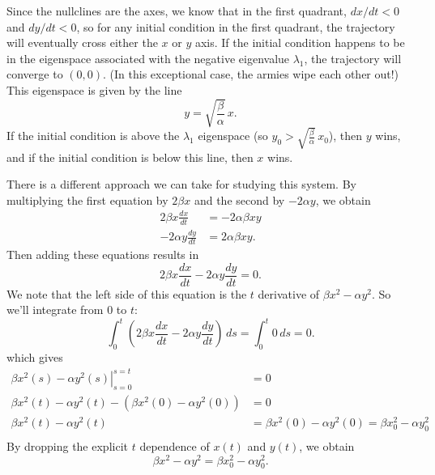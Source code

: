 \documentclass{book}
\begin{document}
Since the nullclines are the axes, we know that in the first
quadrant, $dx/dt < 0$ and $dy/dt < 0$, so for any initial
condition in the first quadrant, the trajectory will eventually
cross either the $x$ or $y$ axis. If the initial condition
happens to be in the eigenspace associated with the negative
eigenvalue $\lambda_1$, the trajectory will converge to
$(0,0)$. (In this exceptional case, the armies wipe each
other out!)
This eigenspace is given by the line
\begin{equation}
  y = \sqrt{\frac{\beta}{\alpha}}\, x.
\end{equation}
If the initial condition is above the $\lambda_1$ eigenspace
(so $y_0 > \sqrt{\frac{\beta}{\alpha}}\, x_0$), then
$y$ wins, and if the initial condition is below this line,
then $x$ wins.

There is a different approach we can take for studying
this system.
By multiplying the first equation by $2\beta x$ and the
second by $-2\alpha y$, we obtain
\begin{equation}
\begin{split}
 2\beta x\frac{dx}{dt} & = -2 \alpha \beta x y \\
 -2\alpha y\frac{dy}{dt} & = 2 \alpha \beta x y.
\end{split}
\end{equation}
Then adding these equations results in
\begin{equation}
   2\beta x\frac{dx}{dt} -2\alpha y\frac{dy}{dt} = 0.
\end{equation}
We note that the left side of this equation is
the $t$ derivative of $\beta x^2 - \alpha y^2$.
So we'll integrate from $0$ to $t$:
\begin{equation}
   \int_0^t \left(2\beta x\frac{dx}{dt} -2\alpha y\frac{dy}{dt}\right)\, ds = \int_0^t 0 \, ds = 0.
\end{equation}
which gives
\begin{equation}
\begin{split}
  \left.\beta x^2(s) - \alpha y^2(s)\right|_{s=0}^{s=t} & = 0 \\
   \beta x^2(t) - \alpha y^2(t) - (\beta x^2(0) - \alpha y^2(0)) & = 0 \\
      \beta x^2(t) - \alpha y^2(t) & = \beta x^2(0) - \alpha y^2(0) =
         \beta x_0^2 - \alpha y_0^2 \\
\end{split}
\end{equation}
By dropping the explicit $t$ dependence of $x(t)$
and $y(t)$, we obtain
\begin{equation}
   \beta x^2 - \alpha y^2 = \beta x_0^2 - \alpha y_0^2.
   \label{eqn:lanchester_hyperbola}
\end{equation}
\end{document}

